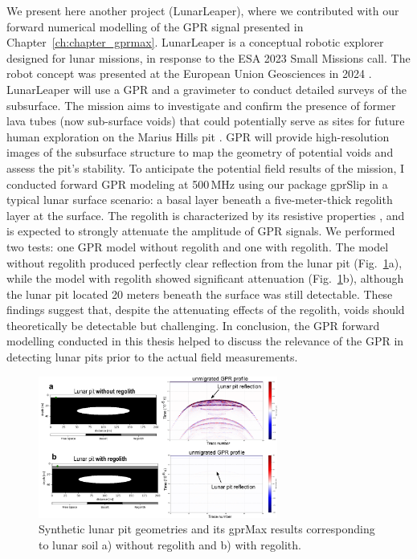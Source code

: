 We present here another project (LunarLeaper), where we contributed with our forward numerical modelling of the GPR signal presented in Chapter~\ref{ch:chapter_gprmax}. LunarLeaper is a conceptual robotic explorer designed for lunar missions, in response to the ESA 2023 Small Missions call. The robot concept was presented at the European Union Geosciences in 2024 \citep{Mittelholz&al2024}. LunarLeaper will use a GPR and a gravimeter to conduct detailed surveys of the subsurface. The mission aims to investigate and confirm the presence of former lava tubes (now sub-surface voids) that could potentially serve as sites for future human exploration on the Marius Hills pit \citep{Wagner&al2014,Sauro&al2020}. GPR will provide high-resolution images of the subsurface structure to map the geometry of potential voids and assess the pit's stability. 
%
To anticipate the potential field results of the mission, I conducted forward GPR modeling at 500\,MHz using our package gprSlip in a typical lunar surface scenario: a basal layer beneath a five-meter-thick regolith layer at the surface. The regolith is characterized by its resistive properties \citep{Ding&al2022}, and is expected to strongly attenuate the amplitude of GPR signals. We performed two tests: one GPR model without regolith and one with regolith. The model without regolith produced perfectly clear reflection from the lunar pit (Fig.~\ref{fig:lunar_pit}a), while the model with regolith showed significant attenuation (Fig.~\ref{fig:lunar_pit}b), although the lunar pit located 20 meters beneath the surface was still detectable. These findings suggest that, despite the attenuating effects of the regolith, voids should theoretically be detectable but challenging. In conclusion, the GPR forward modelling conducted in this thesis helped to discuss the relevance of the GPR in detecting lunar pits prior to the actual field measurements. 


\begin{figure}[H]
    \centering
    \includegraphics[width=0.7\textwidth]{chapters/Discussion/lunar_pit.pdf}
    \caption{Synthetic lunar pit geometries and its gprMax results corresponding to lunar soil a) without regolith and b) with regolith.}
    \label{fig:lunar_pit}
\end{figure}


